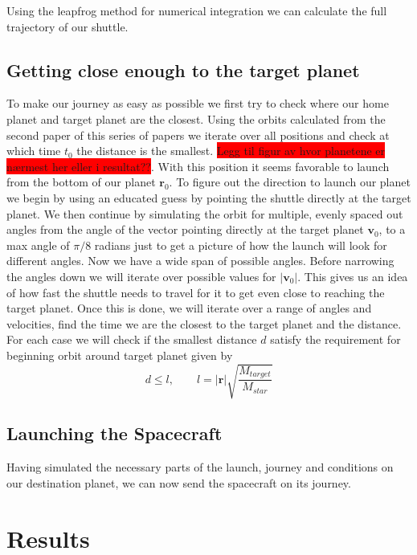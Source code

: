 \documentclass[reprint,english,notitlepage]{revtex4-2}
\begin{document}
Using the leapfrog method for numerical integration we can calculate the full trajectory of our shuttle.
\newline

\subsection{Getting close enough to the target planet}
To make our journey as easy as possible we first try to check where our home planet and target planet are the closest.
Using the orbits calculated from the second paper %
of this series of papers we iterate over all positions and check at which time $ t_{0} $ the distance is the smallest.
\colorbox{red}{Legg til figur av hvor planetene er nærmest her eller i } \colorbox{red}{resultat??}.
With this position it seems favorable to launch from the bottom of our planet $ \mathbf{r}_0 $.
To figure out the direction to launch our planet we begin by using an educated guess by pointing the shuttle directly at the target planet.
We then continue by simulating the orbit for multiple, evenly spaced out angles from the angle of the vector pointing directly at the target planet $ \mathbf{v}_0 $, to a max angle of $ \pi/8 $ radians just to get a picture of how the launch will look for different angles.
Now we have a wide span of possible angles.
Before narrowing the angles down we will iterate over possible values for $ \left\vert \mathbf{v}_0 \right\vert  $.
This gives us an idea of how fast the shuttle needs to travel for it to get even close to reaching the target planet.
Once this is done, we will iterate over a range of angles and velocities, find the time we are the closest to the target planet and the distance.
For each case we will check if the smallest distance $ d $ satisfy the requirement for beginning orbit around target planet given by
\[
d \le l, \qquad l = \left\vert \mathbf{r} \right\vert \sqrt{\frac{M_{target}}{M_{star}}}  
\]




\subsection{Launching the Spacecraft}\label{subsec:launching-the-spacecraft}
    Having simulated the necessary parts of the launch, journey and conditions on our destination planet, we can now send the spacecraft on its journey.


\section{Results} \label{sec: results}
\end{document}
